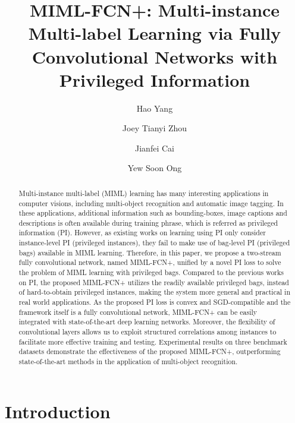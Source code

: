 \documentclass[10pt,twocolumn,letterpaper]{article}
\begin{document}
\title{MIML-FCN+: Multi-instance Multi-label Learning via Fully Convolutional Networks with Privileged Information}

\author[*]{Hao Yang}
\author[**]{Joey Tianyi Zhou}
\author[*]{Jianfei Cai}
\author[*]{Yew Soon Ong}




\maketitle

\begin{abstract}
	
	Multi-instance multi-label (MIML) learning has many interesting
	applications in computer visions, including multi-object
	recognition and automatic image tagging. In these applications,
	additional information such as bounding-boxes, image captions and
	descriptions is often available during training phrase, which is
	referred as privileged information (PI). However, as existing
	works on learning using PI only consider instance-level PI
	(privileged instances), they fail to make use of bag-level PI
	(privileged bags) available in MIML learning. Therefore, in this
	paper, we propose a two-stream fully convolutional network, named
	\textsc{MIML-FCN+}, unified by a novel PI loss to solve the
	problem of MIML learning with privileged bags. Compared to the
	previous works on PI, the proposed \textsc{MIML-FCN+} utilizes the
	readily available privileged bags, instead of hard-to-obtain
	privileged instances, making the system more general and practical
	in real world applications. As the proposed PI loss is convex and
	SGD-compatible and the framework itself is a fully convolutional
	network, \textsc{MIML-FCN+} can be easily integrated with
	state-of-the-art deep learning networks. Moreover, the flexibility
	of convolutional layers allows us to exploit structured
	correlations among instances to facilitate more effective training
	and testing. Experimental results on three benchmark datasets
	demonstrate the effectiveness of the proposed \textsc{MIML-FCN+},
	outperforming state-of-the-art methods in the application of
	multi-object recognition.
\end{abstract}

\section{Introduction}
\end{document}

